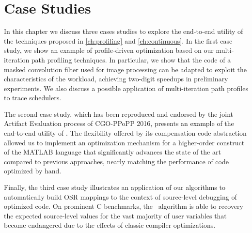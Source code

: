 \chapter{Case Studies}
\label{ch:case-studies}

In this chapter we discuss three cases studies to explore the end-to-end utility of the techniques proposed in \mychapter\ref{ch:profiling} and \mychapter\ref{ch:continuous}. In the first case study, we show an example of profile-driven optimization based on our multi-iteration path profiling techniques. In particular, we show that the code of a masked convolution filter used for image processing can be adapted to exploit the characteristics of the workload, achieving two-digit speedups in preliminary experiments. We also discuss a possible application of multi-iteration path profiles to trace schedulers.

The second case study, which has been reproduced and endorsed by the joint Artifact Evaluation process of CGO-PPoPP 2016, presents an example of the end-to-end utility of \osrkit. The flexibility offered by its compensation code abstraction allowed us to implement an optimization mechanism for a higher-order construct of the MATLAB language that significantly advances the state of the art compared to previous approaches, nearly matching the performance of code optimized by hand.

Finally, the third case study illustrates an application of our algorithms to automatically build OSR mappings to the context of source-level debugging of optimized code. On prominent C benchmarks, the \reconstruct\ algorithm is able to recovery the expected source-level values for the vast majority of user variables that become endangered due to the effects of classic compiler optimizations.



